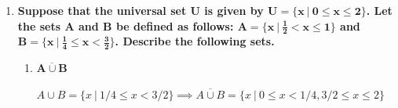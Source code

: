 \documentclass[10pt, oneside]{article}
\begin{document}
\begin{enumerate}[label=1.\arabic*]
\begin{enumerate}
	\item  \begin{tcolorbox}[
	  colback=Cerulean!5!white,
	  colframe=Cerulean!75!black]
	\textbf{$\bm{\overline{A \cap (\overline{B \cap C})}}$}
	\end{tcolorbox}
	
	\begin{align*}
	B \cap C = \{ 5 \} &\implies \overline{B \cap C} = \{ 1, ..., 4, 6, ..., 10 \} \\
	&\implies A \cap (\overline{B \cap C}) = \{ 2, 3, 4 \} \\
	&\implies \boxed{ \overline{A \cap (\overline{B \cap C})} = \{ 1, 5, ..., 10 \} }
	\end{align*}
	
	\item  \begin{tcolorbox}[
	  colback=Cerulean!5!white,
	  colframe=Cerulean!75!black]
	\textbf{$\bm{\overline{A \cap (B \cup C)}}$}
	\end{tcolorbox}
	
	\begin{align*}
	B \cup C = \{ 3, 4, 5, 6, 7 \} &\implies A \cap (B \cup C) = \{ 3, 4 \} \\
	&\implies \boxed{ \overline{A \cap (B \cup C)} = \{ 1, 2, 5, ..., 10 \} }
	\end{align*}
	
	\end{enumerate}

\item  \begin{tcolorbox}[
  colback=Cerulean!5!white,
  colframe=Cerulean!75!black]
\textbf{Suppose that the universal set $\bm{U}$ is given by $\bm{U = \{ x \ | \ 0 \leq x \leq 2 \}}$. Let the sets $\bm{A}$ and $\bm{B}$ be defined as follows: $\bm{A = \{ x \ | \ \frac{1}{2} < x \leq 1 \}}$ and $\bm{B = \{ x \ | \ \frac{1}{4} \leq x < \frac{3}{2} \}}$. Describe the following sets.}
\end{tcolorbox}

	\begin{enumerate}
	\item  \begin{tcolorbox}[
	  colback=Cerulean!5!white,
	  colframe=Cerulean!75!black]
	\textbf{$\bm{\overline{A \cup B}}$}
	\end{tcolorbox}
	
	$A \cup B = \{ x \ | \ 1/4 \leq x < 3/2 \} \implies \boxed{\overline{A \cup B} = \{ x \ | \ 0 \leq x < 1/4, 3/2 \leq x \leq 2 \} }$
	

\end{enumerate}
\end{enumerate}
\end{document}
